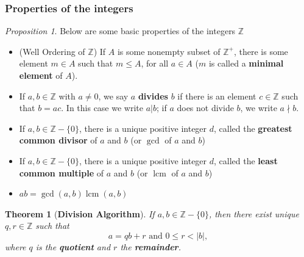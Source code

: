 \documentclass[paper=a4, fontsize=11pt]{scrartcl}
\newtheorem{theorem}{Theorem}[section]
\numberwithin{equation}{section}		%
\numberwithin{figure}{section}			%
\numberwithin{table}{section}				%
\newcommand{\lcm}{\ensuremath{\operatorname{lcm}}}
\theoremstyle{definition}
\theoremstyle{remark}
\theoremstyle{example}
\newtheorem{prop}{Proposition}[section]
\begin{document}
\newpage
\subsubsection{Properties of the integers}

\begin{prop}
    Below are some basic properties of the integers $\mathbb{Z}$
    \begin{itemize}
        \item (Well Ordering of $\mathbb{Z}$) If $A$ is some nonempty subset of $\mathbb{Z}^{+}$, there is some element $m \in A$ such that $m \leq A$, for all $a \in A$ ($m$ is called a \textbf{minimal element} of $A$).
        \item If $a,b \in \mathbb{Z}$ with $a \neq 0$, we say $a$ \textbf{divides} $b$ if there is an element $c \in \mathbb{Z}$ such that $b = ac$. In this case we write $a \lvert b$; if $a$ does not divide $b$, we write $a \nmid b$.
        \item If $a,b \in \mathbb{Z}-\{0\}$, there is a unique positive integer $d$, called the \textbf{greatest common divisor} of $a$ and $b$ (or $\gcd$ of $a$ and $b$)
        \item If $a,b \in \mathbb{Z}-\{0\}$, there is a unique positive integer $d$, called the \textbf{least common multiple} of $a$ and $b$ (or $\lcm$ of $a$ and $b$)
        \item $ab = \gcd(a,b)\lcm(a,b)$
    \end{itemize}
\end{prop}

\begin{theorem}[\textbf{Division Algorithm}]
    If $a,b \in \mathbb{Z}-\{0\}$, then there exist unique $q,r \in \mathbb{Z}$ such that
    \begin{equation}
        a = qb +r \text{ and } 0 \leq r < \lvert b \rvert,
    \end{equation}
    where $q$ is the \textbf{quotient} and $r$ the \textbf{remainder}.
\end{theorem}
\end{document}
